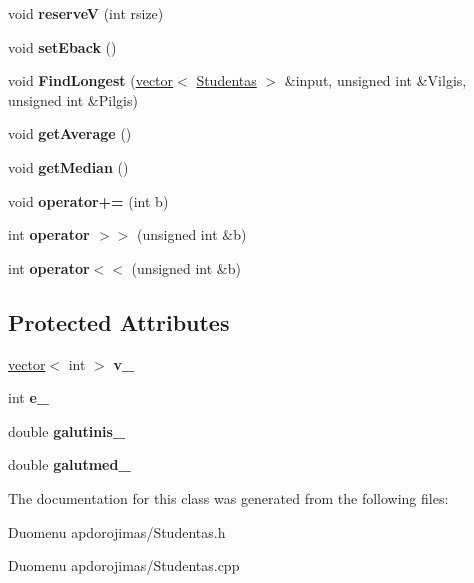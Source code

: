 \begin{DoxyCompactItemize}
\mbox{\label{class_studentas_a631ac679f6ddb6852f958eb492c57016}} 
void {\bfseries reserveV} (int rsize)
\item 
\mbox{\label{class_studentas_a91d097c58adecebdbe701b73de16b95f}} 
void {\bfseries set\+Eback} ()
\item 
\mbox{\label{class_studentas_a657705d237642c5ac4d3607f42755281}} 
void {\bfseries Find\+Longest} (\mbox{\hyperlink{classvector}{vector}}$<$ \mbox{\hyperlink{class_studentas}{Studentas}} $>$ \&input, unsigned int \&Vilgis, unsigned int \&Pilgis)
\item 
\mbox{\label{class_studentas_a768fdf960991ec69b5ab0f9c0bb7bcbc}} 
void {\bfseries get\+Average} ()
\item 
\mbox{\label{class_studentas_a25a38edcd77f7737ef7c61817f930236}} 
void {\bfseries get\+Median} ()
\item 
\mbox{\label{class_studentas_a54b2988d99e550b6a7f15229ed1ca566}} 
void {\bfseries operator+=} (int b)
\item 
\mbox{\label{class_studentas_a8a6bd7da58941710dcaba3a0e1d37d0b}} 
int {\bfseries operator $>$$>$} (unsigned int \&b)
\item 
\mbox{\label{class_studentas_a5c6c4e35fae67372f966b65bf9a0fddb}} 
int {\bfseries operator$<$$<$} (unsigned int \&b)
\end{DoxyCompactItemize}
\subsection*{Protected Attributes}
\begin{DoxyCompactItemize}
\item 
\mbox{\label{class_studentas_a60ca69a249b6d9724dcbbccb3d005b6f}} 
\mbox{\hyperlink{classvector}{vector}}$<$ int $>$ {\bfseries v\+\_\+}
\item 
\mbox{\label{class_studentas_a08dde2a146a73f275fd25384d8ae74d4}} 
int {\bfseries e\+\_\+}
\item 
\mbox{\label{class_studentas_a23307b2f7e41031cd7958022f0adbdae}} 
double {\bfseries galutinis\+\_\+}
\item 
\mbox{\label{class_studentas_a032c6b234f6f3d524773f25ec574d094}} 
double {\bfseries galutmed\+\_\+}
\end{DoxyCompactItemize}


The documentation for this class was generated from the following files\+:\begin{DoxyCompactItemize}
\item 
Duomenu apdorojimas/Studentas.\+h\item 
Duomenu apdorojimas/Studentas.\+cpp\end{DoxyCompactItemize}
